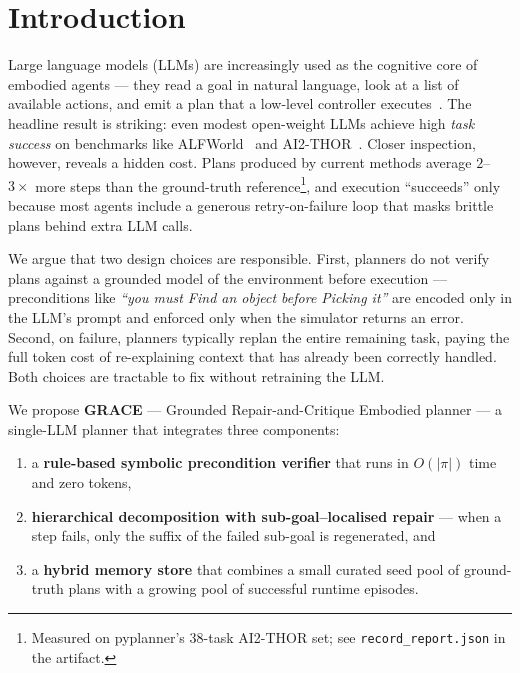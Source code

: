 
\section{Introduction}\label{sec:intro}

Large language models (LLMs) are increasingly used as the cognitive
core of embodied agents — they read a goal in natural language, look
at a list of available actions, and emit a plan that a low-level
controller executes~\cite{ahn2022saycan, huang2022innermonologue,
singh2022progprompt, liang2022codeaspolicies}. The headline result is
striking: even modest open-weight LLMs achieve high \emph{task
success} on benchmarks like ALFWorld~\cite{shridhar2020alfworld} and
AI2-THOR~\cite{kolve2017thor}. Closer inspection, however, reveals a
hidden cost. Plans produced by current methods average $2$--$3\times$
more steps than the ground-truth reference\footnote{Measured on
pyplanner's 38-task AI2-THOR set;
see \texttt{record\_report.json} in the artifact.}, and execution
``succeeds'' only because most agents include a generous retry-on-failure
loop that masks brittle plans behind extra LLM calls.

We argue that two design choices are responsible. First, planners do
not verify plans against a grounded model of the environment before
execution — preconditions like \emph{``you must Find an object before
Picking it''} are encoded only in the LLM's prompt and enforced only
when the simulator returns an error. Second, on failure, planners
typically replan the entire remaining task, paying the full token cost
of re-explaining context that has already been correctly handled. Both
choices are tractable to fix without retraining the LLM.

We propose \textbf{GRACE} — Grounded Repair-and-Critique Embodied
planner — a single-LLM planner that integrates three components:
\begin{enumerate}
  \item a \textbf{rule-based symbolic precondition verifier}
        that runs in $O(|\pi|)$ time and zero tokens,
  \item \textbf{hierarchical decomposition with sub-goal--localised
        repair} — when a step fails, only the suffix of the failed
        sub-goal is regenerated, and
  \item a \textbf{hybrid memory store} that combines a small curated
        seed pool of ground-truth plans with a growing pool of
        successful runtime episodes.
\end{enumerate}

